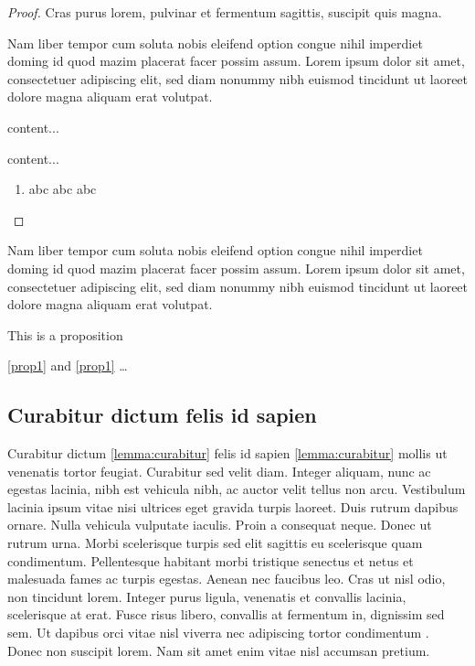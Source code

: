 \documentclass[a4paper,UKenglish,cleveref, autoref, thm-restate]{lipics-v2021}
\begin{document}
\begin{proof}
Cras purus lorem, pulvinar et fermentum sagittis, suscipit quis magna.

Nam liber tempor cum soluta nobis eleifend option congue nihil imperdiet doming id quod mazim placerat facer possim assum. Lorem ipsum dolor sit amet, consectetuer adipiscing elit, sed diam nonummy nibh euismod tincidunt ut laoreet dolore magna aliquam erat volutpat.
\begin{claim}
content...
\end{claim}
\begin{claimproof}
content...
    \begin{enumerate}
        \item abc abc abc \claimqedhere{}
    \end{enumerate}
\end{claimproof}

\end{proof}

\begin{corollary}
\label{lemma:curabitur}
Nam liber tempor cum soluta nobis eleifend option congue nihil imperdiet doming id quod mazim placerat facer possim assum. Lorem ipsum dolor sit amet, consectetuer adipiscing elit, sed diam nonummy nibh euismod tincidunt ut laoreet dolore magna aliquam erat volutpat.
\end{corollary}

\begin{proposition}\label{prop1}
This is a proposition
\end{proposition}

\autoref{prop1} and \cref{prop1} \ldots

\subsection{Curabitur dictum felis id sapien}

Curabitur dictum \cref{lemma:curabitur} felis id sapien \autoref{lemma:curabitur} mollis ut venenatis tortor feugiat. Curabitur sed velit diam. Integer aliquam, nunc ac egestas lacinia, nibh est vehicula nibh, ac auctor velit tellus non arcu. Vestibulum lacinia ipsum vitae nisi ultrices eget gravida turpis laoreet. Duis rutrum dapibus ornare. Nulla vehicula vulputate iaculis. Proin a consequat neque. Donec ut rutrum urna. Morbi scelerisque turpis sed elit sagittis eu scelerisque quam condimentum. Pellentesque habitant morbi tristique senectus et netus et malesuada fames ac turpis egestas. Aenean nec faucibus leo. Cras ut nisl odio, non tincidunt lorem. Integer purus ligula, venenatis et convallis lacinia, scelerisque at erat. Fusce risus libero, convallis at fermentum in, dignissim sed sem. Ut dapibus orci vitae nisl viverra nec adipiscing tortor condimentum \cite{DBLP:journals/cacm/Dijkstra68a}. Donec non suscipit lorem. Nam sit amet enim vitae nisl accumsan pretium. 
\end{document}
